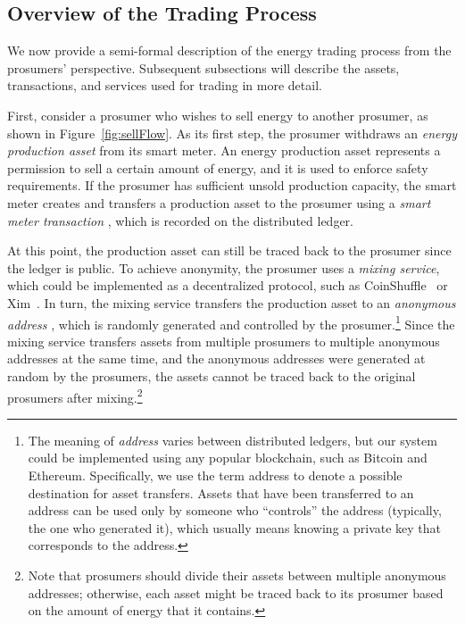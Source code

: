 \subsection{Overview of the Trading Process}
We now provide a semi-formal description of the energy trading process
from the prosumers' perspective. 
Subsequent subsections will describe the assets, transactions, and services used for trading in more detail.  

First, consider a prosumer who wishes to sell energy to another
prosumer, as shown in Figure~\ref{fig:sellFlow}. 
As its first step, the prosumer withdraws an \emph{energy production asset} from its smart meter.
An energy production asset represents a permission to sell a certain amount of energy, and it is used to enforce safety requirements.
If the prosumer has sufficient unsold production capacity, the smart meter creates and transfers a production asset to the prosumer using a \emph{smart meter transaction} , which is recorded on the distributed ledger.

At this point, the production asset can still be traced back to the prosumer since the ledger is public.
To achieve anonymity, the prosumer uses a \emph{mixing service}, which could be implemented as a decentralized protocol, such as CoinShuffle~\cite{ruffing2014coinshuffle} or Xim~\cite{bissias2014sybil}.
In turn, the mixing service
transfers the production asset to an \emph{anonymous address} ,
which is randomly generated and controlled by the
prosumer.\footnote{The meaning of \emph{address} varies between distributed ledgers, but our system could be implemented using any popular blockchain, such as Bitcoin and Ethereum. 
Specifically, we use the term address to denote a possible destination for asset transfers. 
Assets that have been transferred to an address can be used only by someone who ``controls'' the address (typically, the one who generated it), which usually means knowing a private key that corresponds to the address.} %
Since the mixing service transfers assets from multiple prosumers to
multiple anonymous addresses at the same time, and the anonymous
addresses were generated at random by the prosumers, the assets
cannot be traced back to the original prosumers after
mixing.\footnote{Note that prosumers should divide their assets between multiple
  anonymous addresses; otherwise, each asset might be traced back to
  its prosumer based on the amount of energy that it contains.}

